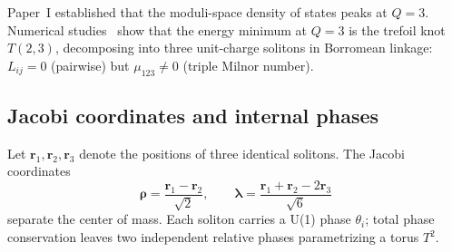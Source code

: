 \documentclass[a4paper,12pt]{article}
\begin{document}
Paper~I established that the moduli-space density of states peaks at
$Q = 3$. Numerical studies~\cite{Battye1998,Hietarinta1999} show
that the energy minimum at $Q = 3$ is the trefoil knot $T(2,3)$,
decomposing into three unit-charge solitons in Borromean linkage:
$L_{ij} = 0$ (pairwise) but $\mu_{123} \neq 0$ (triple Milnor
number).

\subsection{Jacobi coordinates and internal phases}

Let $\mathbf{r}_1, \mathbf{r}_2, \mathbf{r}_3$ denote the positions
of three identical solitons. The Jacobi coordinates
\begin{equation}
 \boldsymbol{\rho} = \frac{\mathbf{r}_1 - \mathbf{r}_2}{\sqrt{2}},
 \qquad
 \boldsymbol{\lambda} = \frac{\mathbf{r}_1 + \mathbf{r}_2
 - 2\mathbf{r}_3}{\sqrt{6}}
\end{equation}
separate the center of mass. Each soliton carries a U(1) phase
$\theta_i$; total phase conservation leaves two independent relative
phases parametrizing a torus $T^2$.
\end{document}
